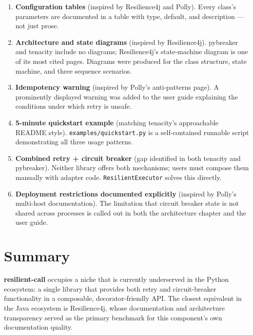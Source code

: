 \begin{enumerate}[leftmargin=*, label=\arabic*.]
    \item \textbf{Configuration tables} (inspired by Resilience4j and Polly).
          Every class's parameters are documented in a table with type, default,
          and description — not just prose.

    \item \textbf{Architecture and state diagrams} (inspired by Resilience4j).
          pybreaker and tenacity include no diagrams; Resilience4j's
          state-machine diagram is one of its most cited pages.  Diagrams were
          produced for the class structure, state machine, and three sequence
          scenarios.

    \item \textbf{Idempotency warning} (inspired by Polly's anti-patterns
          page).  A prominently displayed warning was added to the user guide
          explaining the conditions under which retry is unsafe.

    \item \textbf{5-minute quickstart example} (matching tenacity's
          approachable README style).  \texttt{examples/quickstart.py} is a
          self-contained runnable script demonstrating all three usage
          patterns.

    \item \textbf{Combined retry + circuit breaker} (gap identified in both
          tenacity and pybreaker).  Neither library offers both mechanisms;
          users must compose them manually with adapter code.
          \texttt{ResilientExecutor} solves this directly.

    \item \textbf{Deployment restrictions documented explicitly} (inspired by
          Polly's multi-host documentation).  The limitation that circuit
          breaker state is not shared across processes is called out in both
          the architecture chapter and the user guide.
\end{enumerate}

\section{Summary}
\label{sec:competitive-summary}

\textbf{resilient-call} occupies a niche that is currently underserved in the
Python ecosystem: a single library that provides both retry and circuit-breaker
functionality in a composable, decorator-friendly API.  The closest equivalent
in the Java ecosystem is Resilience4j, whose documentation and architecture
transparency served as the primary benchmark for this component's own
documentation quality.
